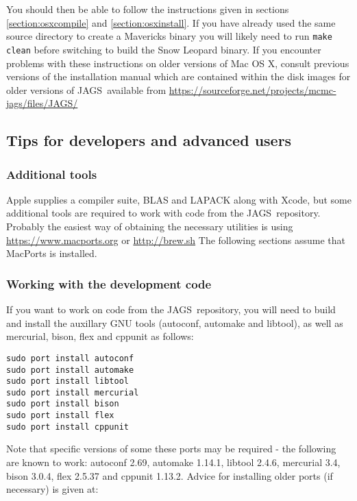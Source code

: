 \documentclass[11pt, a4paper, titlepage]{article}
\newcommand{\JAGS}{\textsf{JAGS}}
\begin{document}
You should then be able to follow the instructions given in sections \ref{section:osxcompile}
and \ref{section:osxinstall}.  If you have already used the same source directory to create
a Mavericks binary you will likely need to run \texttt{make clean} before switching
to build the Snow Leopard binary. If you encounter problems with these instructions on 
older versions of Mac OS X, consult previous versions of the installation manual 
which are contained within the disk images for older versions of \JAGS\ available from
\url{https://sourceforge.net/projects/mcmc-jags/files/JAGS/}


\subsection{Tips for developers and advanced users}

\subsubsection{Additional tools}
\label{section:osxtools}

Apple supplies a compiler suite, BLAS and LAPACK along with Xcode, but some
additional tools are required to work with code from the \JAGS\ repository.  Probably 
the easiest way of obtaining the necessary utilities is using
\url{https://www.macports.org} or \url{http://brew.sh} The following sections assume
that MacPorts is installed.

\subsubsection{Working with the development code}

If you want to work on code from the \JAGS\ repository, you will need to
build and install the auxillary GNU tools (autoconf, automake and
libtool), as well as mercurial, bison, flex and cppunit as follows:

\begin{verbatim}
sudo port install autoconf
sudo port install automake
sudo port install libtool
sudo port install mercurial
sudo port install bison
sudo port install flex
sudo port install cppunit
\end{verbatim}

Note that specific versions of some these ports may be required - the following 
are known to work:  autoconf 2.69, automake 1.14.1, libtool 2.4.6, 
mercurial 3.4, bison 3.0.4, flex 2.5.37 and cppunit 1.13.2.  Advice for
installing older ports (if necessary) is given at:
\end{document}
